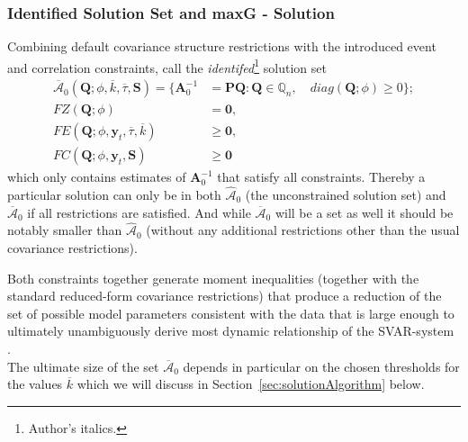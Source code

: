 \documentclass[a4paper,11pt,listof=nochaptergap,oneside,pointednumbers,bibtotoc,bigheadings,liststotoc,hidelinks]{scrbook}
\theoremstyle{mysatz}
\theoremstyle{mydefinition}
\theoremstyle{mytheorem}
\theoremstyle{mybemerkung}
\let\oldhat\hat
\newcommand{\vect}[1]{\boldsymbol{\mathbf{#1}}}
\newcommand{\hatt}[1]{\oldhat{\boldsymbol{\mathbf{#1}}}}
\begin{document}
\subsubsection{Identified Solution Set and maxG - Solution}
Combining default covariance structure restrictions with the introduced event and correlation constraints, \citet{ludvigsonetal:18,ludvigsonetal:19} call the \textit{identifed}\footnote{Author's italics.} solution set 
\begin{equation} \label{eq:svar_ludvi14}
\begin{split}
\overline{\vect{\mathcal{A}}}_0(\vect{Q}; \phi, \overline{k}, \overline{\tau}, \vect{S})  = \{\vect{A}_0^{-1} & = \vect{P}\vect{Q}: \vect{Q} \in \mathbb{Q}_n, \quad diag(\vect{Q}; \phi) \geq 0\}; \\
			FZ(\vect{Q}; \phi) & = \vect{0}, \\
			FE(\vect{Q}; \phi, \vect{y}_t, \overline{\tau}, \overline{k}) & \geq \vect{0}, \\
			FC(\vect{Q}; \phi, \vect{y}_t, \vect{S}) & \geq \vect{0}
\end{split}								
\end{equation}
which only contains estimates of $\vect{A}_0^{-1}$ that satisfy all constraints. Thereby a particular solution can only be in both $\hatt{\mathcal{A}}_0$ (the unconstrained solution set) and $\overline{\vect{\mathcal{A}}}_0$ if all restrictions are satisfied. And while $\overline{\vect{\mathcal{A}}}_0$ will be a set as well it should be notably smaller than $\hatt{\mathcal{A}}_0$ (without any additional restrictions other than the usual covariance restrictions).

Both constraints together generate moment inequalities (together with the standard reduced-form covariance restrictions) that produce a reduction of the set of possible model parameters consistent with the data that is large enough to ultimately unambiguously derive most dynamic relationship of the SVAR-system \citep{ludvigsonetal:19}.\\

The ultimate size of the set $\overline{\vect{\mathcal{A}}}_0$ depends in particular on the chosen thresholds for the values $\overline{k}$ which we will discuss in Section~\ref{sec:solutionAlgorithm} below.
\end{document}
